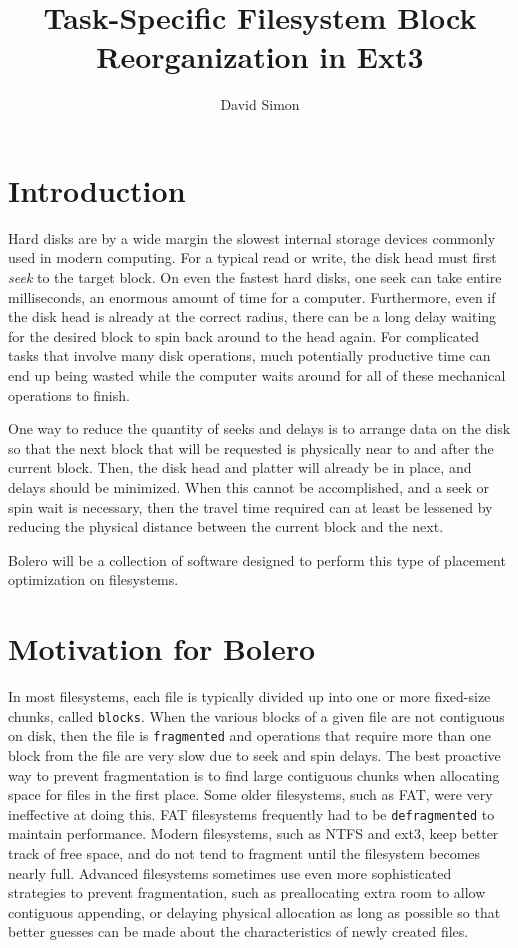\documentclass[10pt]{article}
\author{David Simon}
\title{Task-Specific Filesystem Block Reorganization in Ext3}
\begin{document}
\maketitle

\section{Introduction}

Hard disks are by a wide margin the slowest internal storage devices commonly
used in modern computing. For a typical read or write, the disk head must first
\emph{seek} to the target block\cite{seektime}. On even the fastest hard disks\cite{deskstar}, one seek
can take entire milliseconds, an enormous amount of time for a computer. Furthermore, even if the disk head is already at the correct radius, there can be a long delay waiting for the
desired block to spin back around to the head again\cite{latency}. For complicated tasks that involve
many disk operations, much potentially productive time can end up being wasted while
the computer waits around for all of these mechanical operations to finish.

One way to reduce the quantity of seeks and delays is to arrange data on
the disk so that the next block that will be requested is physically near to
and after the current block\cite{autolocality}. Then, the disk head and platter will already be in place,
and delays should be minimized. When this cannot be accomplished, and a seek or
spin wait is necessary, then the travel time required can at least be lessened by reducing the
physical distance between the current block and the next.

Bolero will be a collection of software designed to perform this type of
placement optimization on filesystems.

\section{Motivation for Bolero}\label{sec:motive}

In most filesystems, each file is typically divided up
into one or more fixed-size chunks, called \texttt{blocks}. When the various blocks
of a given file are not contiguous on disk, then the file is \texttt{fragmented}
and operations that require more than one block from the file are very slow due to
seek and spin delays. The best proactive way to prevent fragmentation is to find large contiguous
chunks when allocating space for files in the first place. Some older filesystems, such as FAT, were
very ineffective at doing this\cite{fathistory}.
FAT filesystems frequently had to be \texttt{defragmented} to maintain performance.
Modern filesystems, such as NTFS and ext3, keep better track of free space,
and do not tend to fragment until the filesystem becomes nearly full. Advanced filesystems sometimes
use even more sophisticated strategies to prevent fragmentation, such as preallocating extra room to allow 
contiguous appending, or delaying physical allocation as long as possible so that better guesses
can be made about the characteristics of newly created files\cite{xfs}.
\end{document}
